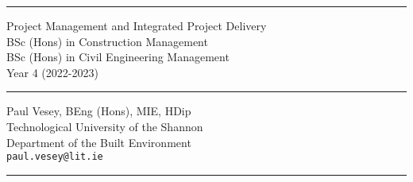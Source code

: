 
\thispagestyle{empty} %


\hrule

\vspace*{0.7cm} %


\begin{flushright}
\Huge Project Management and Integrated Project Delivery \\
\vspace*{0.7cm}
\Large BSc (Hons) in Construction Management\\
BSc (Hons) in Civil Engineering Management\\
Year 4 (2022-2023)
\end{flushright}

\vspace*{0.7cm} %
	
\normalsize

\hrule


\vfill %


{\centering \large 
\hfill Paul Vesey, \scriptsize BEng (Hons), MIE, HDip\normalsize \\
\hfill Technological University of the Shannon \\
\hfill Department of the Built Environment \\
\hfill \texttt{paul.vesey@lit.ie} \\
\vspace*{0.7cm} 
\hrule} %


\clearpage %
